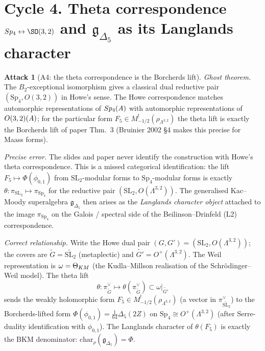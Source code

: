 \documentclass[11pt]{amsart}
\theoremstyle{definition}
\newtheorem{attack}{Attack}
\providecommand{\Sp}{\mathrm{Sp}}
\providecommand{\SL}{\mathrm{SL}}
\providecommand{\Dfive}{\Delta_5}
\providecommand{\gDfive}{\mathfrak{g}_{\Dfive}}
\begin{document}
\section{Cycle 4. Theta correspondence $\Sp_4 \leftrightarrow
\SO(3,2)$ and $\gDfive$ as its Langlands character}

\begin{attack}[A4: the theta correspondence is the Borcherds lift]
\leavevmode

\noindent\emph{Ghost theorem.} The $B_2$-exceptional isomorphism
gives a classical dual reductive pair $(\Sp_4, O(3,2))$ in Howe's
sense. The Howe correspondence matches automorphic representations of
$\Sp_4(\bA)$ with automorphic representations of $O(3,2)(A)$; for
the particular form $F_5 \in M^!_{-1/2}(\rho_{\Lambda^{3,2}})$ the
theta lift is exactly the Borcherds lift of paper Thm.~3
(Bruinier 2002 \S 4 makes this precise for Maass forms).

\noindent\emph{Precise error.} The slides and paper never identify
the construction with Howe's theta correspondence. This is a missed
categorical identification: the lift
$F_5 \mapsto \Phi(\phi_{0,1})$ from $\SL_2$-modular forms to
$\Sp_4$-modular forms is exactly $\theta \colon \pi_{\SL_2} \mapsto
\pi_{\Sp_4}$ for the reductive pair $(\SL_2, O(\Lambda^{3,2}))$. The
generalised Kac--Moody superalgebra $\gDfive$ then arises as the
\emph{Langlands character object} attached to the image
$\pi_{\Sp_4}$ on the Galois / spectral side of the Beilinson--Drinfeld
(L2) correspondence.

\noindent\emph{Correct relationship.} Write the Howe dual pair
$(G, G') = (\SL_2, O(\Lambda^{3,2}))$; the covers are
$\widetilde{G} = \widetilde{\SL_2}$ (metaplectic) and
$\widetilde{G'} = O^+(\Lambda^{3,2})$. The Weil representation is
$\omega = \Theta_{\rm KM}$ (the Kudla--Millson realisation of the
Schr\"odinger--Weil model). The theta lift
\[
 \theta \colon \pi^\vee_{\widetilde{G}} \mapsto
 \theta(\pi^\vee_{\widetilde{G}}) \subset \omega|_{\widetilde{G'}}
\]
sends the weakly holomorphic form
$F_5 \in M^!_{-1/2}(\rho_{\Lambda^{3,2}})$ (a vector in
$\pi^\vee_{\widetilde{\SL_2}}$) to the Borcherds-lifted form
$\Phi(\phi_{0,1}) = \tfrac{1}{64}\Dfive(2Z)$ on
$\Sp_4 \cong O^+(\Lambda^{3,2})$ (after Serre-duality identification
with $\phi_{0,1}$). The Langlands character of $\theta(F_5)$ is
exactly the BKM denominator: $\mathrm{char}_\rho(\gDfive) = \Phi$.
\end{attack}
\end{document}
